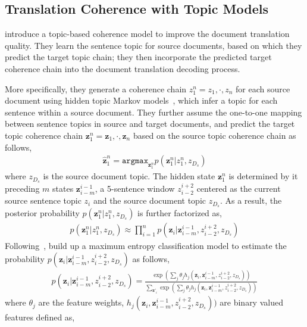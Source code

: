 \subsection{Translation Coherence with Topic Models}


\citet{xiong-13} introduce a topic-based coherence model to improve the document translation quality. They learn the sentence topic for source documents, based on which they predict the target topic chain; they then incorporate the predicted target coherence chain into the document translation decoding process.

More specifically, they generate a coherence chain $z_1^n = z_1, \cdot, z_n$ for each source document using hidden topic Markov models~\citep[HTMM]{gruber-07}, which infer a topic for each sentence within a source document. They further assume the one-to-one mapping between sentence topics in source and target documents, and predict the target topic coherence chain $\textbf{z}_1^n = \textbf{z}_1, \cdot, \textbf{z}_n$ based on the source topic coherence chain as follows,
\begin{align}
\hat{\textbf{z}}_1^n = \texttt{argmax}_{\textbf{z}_1^n} p (\textbf{z}_1^n | z_1^n, z_{D_s})
\end{align}
where $z_{D_s}$ is the source document topic. The hidden state $\textbf{z}_1^n$ is determined by it preceding $m$ states $\textbf{z}_{i-m}^{i-1}$, a 5-sentence window $z_{i-2}^{i+2}$ centered as the current source sentence topic $z_i$ and the source document topic $z_{D_s}$. As a result, the posterior probability $p (\textbf{z}_1^n | z_1^n, z_{D_s})$ is further factorized as,
\begin{align}
p (\textbf{z}_1^n | z_1^n, z_{D_s}) \approx \prod_{i=1}^n p(\textbf{z}_i | \textbf{z}_{i-m}^{i-1}, z_{i-2}^{i+2}, z_{D_s})
\end{align}
Following~\citet{Xiong-2006}, \citet{xiong-13} build up a maximum entropy classification model to estimate the probability $p(\textbf{z}_i | \textbf{z}_{i-m}^{i-1}, z_{i-2}^{i+2}, z_{D_s})$ as follows,
\begin{align}
p(\textbf{z}_i | \textbf{z}_{i-m}^{i-1}, z_{i-2}^{i+2}, z_{D_s}) = \frac{\exp(\sum_j \theta_j h_j(\textbf{z}_i, \textbf{z}_{i-m}^{i-1}, z_{i-2}^{i+2}, z_{D_s}))}{\sum_{\textbf{z}'_i} \exp(\sum_j \theta_j h_j(\textbf{z}_i, \textbf{z}_{i-m}^{i-1}, z_{i-2}^{i+2}, z_{D_s}))}
\end{align}
where $\theta_j$ are the feature weights, $ h_j(\textbf{z}_i, \textbf{z}_{i-m}^{i-1}, z_{i-2}^{i+2}, z_{D_s}))$ are binary valued features defined as,
